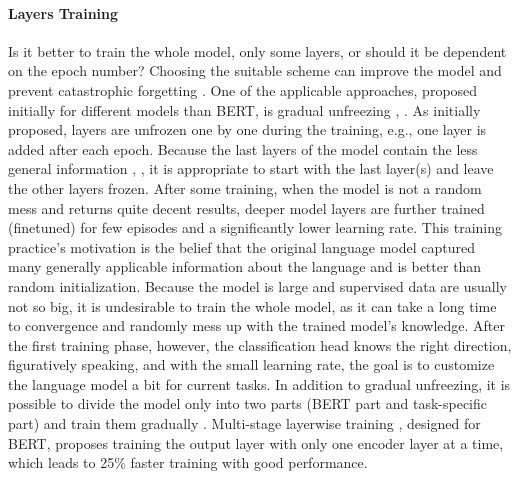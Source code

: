 \paragraph{Layers Training} Is it better to train the whole model, only some layers, or should it be dependent on the epoch number? Choosing the suitable scheme can improve the model and prevent catastrophic forgetting \citep{Liu2020}. One of the applicable approaches, proposed initially for different models than BERT, is gradual unfreezing \citep{Ruder2018}, \citep{Chronopoulou2019}. As initially proposed, layers are unfrozen one by one during the training, e.g., one layer is added after each epoch. Because the last layers of the model contain the less general information \citep{Ruder2018}, \citep{Yosinski2014}, it is appropriate to start with the last layer(s) and leave the other layers frozen. After some training, when the model is not a random mess and returns quite decent results, deeper model layers are further trained (finetuned) for few episodes and a significantly lower learning rate. This training practice's motivation is the belief that the original language model captured many generally applicable information about the language and is better than random initialization. Because the model is large and supervised data are usually not so big, it is undesirable to train the whole model, as it can take a long time to convergence and randomly mess up with the trained model's knowledge. After the first training phase, however, the classification head knows the right direction, figuratively speaking, and with the small learning rate, the goal is to customize the language model a bit for current tasks. In addition to gradual unfreezing, it is possible to divide the model only into two parts (BERT part and task-specific part) and train them gradually \citep{Kondratyuk2019}. Multi-stage layerwise training \citep{Yang2020}, designed for BERT, proposes training the output layer with only one encoder layer at a time, which leads to 25\% faster training with good performance.
